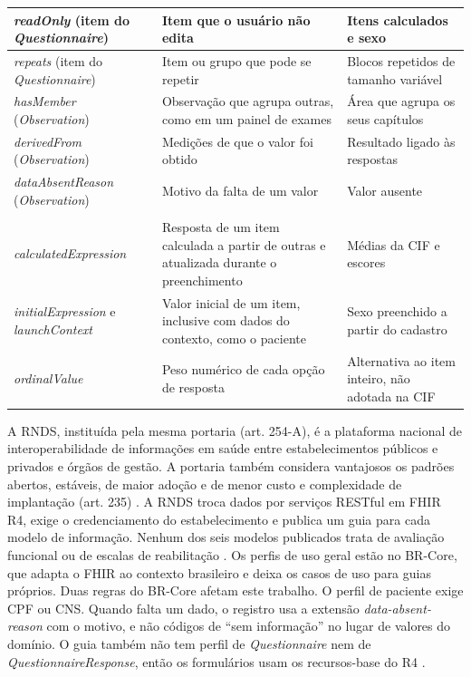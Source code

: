 \begin{quadro}[htb]
\begin{tabularx}{\textwidth}{|>{\raggedright\arraybackslash}p{}|>{\raggedright\arraybackslash}X|>{\raggedright\arraybackslash}p{}|}
		\textit{readOnly} (item do \textit{Questionnaire}) & Item que o usuário não edita & Itens calculados e
			sexo \\ \hline
		\textit{repeats} (item do \textit{Questionnaire}) & Item ou grupo que pode se repetir & Blocos repetidos de
			tamanho variável \\ \hline
		\textit{hasMember} (\textit{Observation}) & Observação que agrupa outras, como em um painel de exames & Área
			que agrupa os seus capítulos \\ \hline
		\textit{derivedFrom} (\textit{Observation}) & Medições de que o valor foi obtido & Resultado ligado às
			respostas \\ \hline
		\textit{dataAbsentReason} (\textit{Observation}) & Motivo da falta de um valor & Valor ausente \\ \hline
		\multicolumn{3}{|l|}{\textbf{Extensões do SDC}} \\ \hline
		\textit{calculatedExpression} & Resposta de um item calculada a partir de outras e atualizada durante o
			preenchimento & Médias da CIF e escores \\ \hline
		\textit{initialExpression} e \textit{launchContext} & Valor inicial de um item, inclusive com dados do
			contexto, como o paciente & Sexo preenchido a partir do cadastro \\ \hline
		\textit{ordinalValue} & Peso numérico de cada opção de resposta & Alternativa ao item inteiro, não adotada
			na CIF \\ \hline
	\end{tabularx}
\end{quadro}

A RNDS, instituída pela mesma portaria (art. 254-A), é a plataforma nacional de interoperabilidade de informações em
saúde entre estabelecimentos públicos e privados e órgãos de gestão. A portaria também considera vantajosos os
padrões abertos, estáveis, de maior adoção e de menor custo e complexidade de implantação (art. 235)
\cite{portaria1434:2020}. A RNDS troca dados por serviços RESTful em FHIR R4, exige o credenciamento do
estabelecimento e publica um guia para cada modelo de informação. Nenhum dos seis modelos publicados trata de
avaliação funcional ou de escalas de reabilitação \cite{rnds2026guia}. Os perfis de uso geral estão no BR-Core, que
adapta o FHIR ao contexto brasileiro e deixa os casos de uso para guias próprios. Duas regras do BR-Core afetam este
trabalho. O perfil de paciente exige CPF ou CNS. Quando falta um dado, o registro usa a extensão
\textit{data-absent-reason} com o motivo, e não códigos de ``sem informação'' no lugar de valores do domínio. O guia
também não tem perfil de \textit{Questionnaire} nem de \textit{QuestionnaireResponse}, então os formulários usam os
recursos-base do R4 \cite{brcore2026}.

